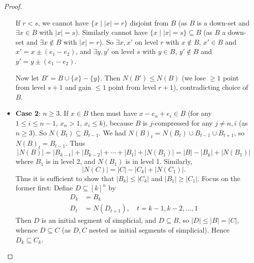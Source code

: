 \documentclass{article}
\let\subset\subseteq
\begin{document}
\begin{proof}
\begin{itemize}
      If $r < s$, we cannot have $\{x \mid |x| = r\}$ disjoint from $B$ (as $B$ is a down-set and $\exists x \in B$ with $|x| = s$).
      Similarly cannot have $\{x \mid |x| = s\} \subset B$ (as $B$ a down-set and $\exists x \notin B$ with $|x| = r$).
      So $\exists x,x'$ on level $r$ with $x \notin B$, $x' \in B$ and $x' = x \pm (e_1 - e_2)$, and $\exists y,y'$ on level $s$ with $y \in B$, $y' \notin B$ and $y' = y \pm (e_1 - e_2)$.
      \begin{center}
      \end{center}

      Now let $B' = B \cup \{x\} - \{y\}$. Then $N(B') \leq N(B)$ (we lose $\geq 1$ point from level $s+1$ and gain $\leq 1$ point from level $r+1$), contradicting choice of $B$.
    \item \textbf{Case 2}: $n \geq 3$.
      If $x \in B$ then must have $x-e_n+e_i \in B$ (for any $1 \leq i \leq n-1$, $x_n > 1$, $x_i \leq k$), because $B$ is $j$-compressed for any $j \neq n,i$ (as $n \geq 3$).
      So $N(B_t) \subset B_{t-1}$.
      We had $N(B)_t = N(B_t) \cup B_{t-1} \cup B_{t+1}$, so $N(B)_t = B_{t-1}$.
      Thus
      \begin{equation*}
        |N(B)| = |B_{k-1}| + |B_{k-2}| + \dotsb + |B_1| + |N(B_1)| = |B| - |B_k| + |N(B_1)|
      \end{equation*}
      where $B_1$ is in level 2, and $N(B_1)$ is in level 1.
      Similarly,
      \begin{equation*}
        |N(C)| = |C| - |C_k| + |N(C_1)|.
      \end{equation*}
      Thus it is sufficient to show that $|B_k| \leq |C_k|$ and $|B_1| \geq |C_1|$.
      Focus on the former first:
      Define  $D \subset [k]^n$ by
      \begin{align*}
        D_k &= B_k \\
        D_t &= N(D_{t+1}), \quad t = k-1, k-2, \dotsc, 1
      \end{align*}
      Then $D$ is an initial segment of simplicial, and $D \subset B$, so $|D| \leq |B| = |C|$, whence $D \subset C$ (as $D,C$ nested as initial segments of simplicial).
      Hence $D_k \subset C_k$.


\end{itemize}
\end{proof}
\end{document}
